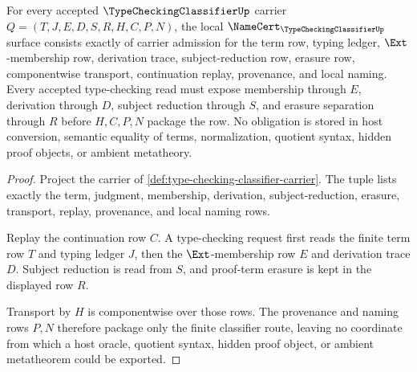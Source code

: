 \begin{theorem}
\label{thm:type-checking-classifier-namecert-obligations}
For every accepted $\TypeCheckingClassifierUp$ carrier $Q=(T,J,E,D,S,R,H,C,P,N)$, the local $\NameCert_{\TypeCheckingClassifierUp}$ surface consists exactly of carrier admission for the term row, typing ledger, $\Ext$-membership row, derivation trace, subject-reduction row, erasure row, componentwise transport, continuation replay, provenance, and local naming. Every accepted type-checking read must expose membership through $E$, derivation through $D$, subject reduction through $S$, and erasure separation through $R$ before $H,C,P,N$ package the row. No obligation is stored in host conversion, semantic equality of terms, normalization, quotient syntax, hidden proof objects, or ambient metatheory.
\end{theorem}
\begin{proof}
Project the carrier of \autoref{def:type-checking-classifier-carrier}. The tuple lists exactly the term, judgment, membership, derivation, subject-reduction, erasure, transport, replay, provenance, and local naming rows.

Replay the continuation row $C$. A type-checking request first reads the finite term row $T$ and typing ledger $J$, then the $\Ext$-membership row $E$ and derivation trace $D$. Subject reduction is read from $S$, and proof-term erasure is kept in the displayed row $R$.

Transport by $H$ is componentwise over those rows. The provenance and naming rows $P,N$ therefore package only the finite classifier route, leaving no coordinate from which a host oracle, quotient syntax, hidden proof object, or ambient metatheorem could be exported.
\end{proof}


